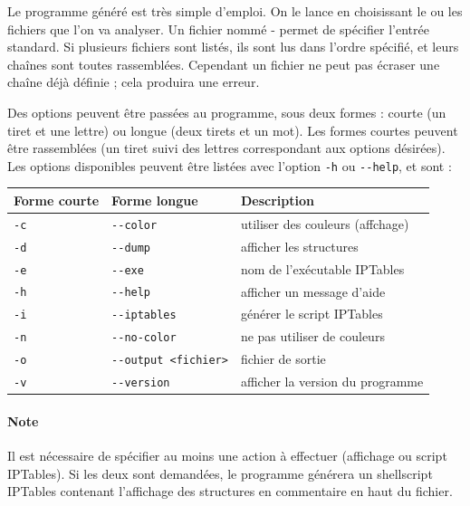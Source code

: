 \documentclass[a4paper,11pt]{report}
\begin{document}
Le programme généré est très simple d'emploi. On le lance en choisissant le ou
les fichiers que l'on va analyser. Un fichier nommé \og-\fg{} permet de
spécifier l'entrée standard. Si plusieurs fichiers sont listés, ils sont lus
dans l'ordre spécifié, et leurs chaînes sont toutes rassemblées. Cependant un
fichier ne peut pas écraser une chaîne déjà définie ; cela produira une
erreur.

Des options peuvent être passées au programme, sous deux formes : courte (un
tiret et une lettre) ou longue (deux tirets et un mot). Les formes courtes
peuvent être rassemblées (un tiret suivi des lettres correspondant aux options
désirées). Les options disponibles peuvent être listées avec l'option
\og\verb!-h!\fg{} ou \og\verb!--help!\fg, et sont :

\begin{center}
  \noindent
  \begin{tabular}{| l | l | l |}
    \hline
    \textbf{Forme courte} & \textbf{Forme longue} & \textbf{Description}\\
    \hline
    \verb!-c! & \verb!--color!            & utiliser des couleurs (affchage)\\
    \verb!-d! & \verb!--dump!             & afficher les structures\\
    \verb!-e! & \verb!--exe!              & nom de l'exécutable IPTables\\
    \verb!-h! & \verb!--help!             & afficher un message d'aide\\
    \verb!-i! & \verb!--iptables!         & générer le script IPTables\\
    \verb!-n! & \verb!--no-color!         & ne pas utiliser de couleurs\\
    \verb!-o! & \verb!--output <fichier>! & fichier de sortie\\
    \verb!-v! & \verb!--version!          & afficher la version du programme\\
    \hline
  \end{tabular}
\end{center}

\paragraph{Note} Il est nécessaire de spécifier au moins une action à
effectuer (affichage ou script IPTables). Si les deux sont demandées, le
programme générera un shellscript IPTables contenant l'affichage des
structures en commentaire en haut du fichier.
\end{document}
